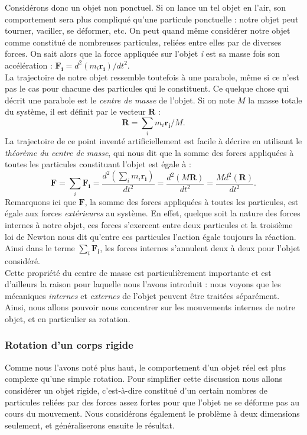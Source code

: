 Considérons donc un objet non ponctuel. Si on lance un tel objet en l'air, son comportement sera plus compliqué qu'une particule ponctuelle : notre objet peut tourner, vaciller, se déformer, etc. On peut quand même considérer notre objet comme constitué de nombreuses particules, reliées entre elles par de diverses forces. On sait alors que la force appliquée sur l'objet \textit{i} est sa masse fois son accélération : $\bm{F_i} = d^2(m_i\bm{r_i})/dt^2$. \\La trajectoire de notre objet ressemble toutefois à une parabole, même si ce n'est pas le cas pour chacune des particules qui le constituent. Ce quelque chose qui décrit une parabole est le \textit{centre de masse} de l'objet. Si on note $M$ la masse totale du système, il est définit par le vecteur $\bm{R}$ :
\begin{equation*}
\bm{R} = \sum_i{m_i\bm{r_i}/M}.
\end{equation*}
La trajectoire de ce point inventé artificiellement est facile à décrire en utilisant le \textit{théorème du centre de masse}, qui nous dit que la somme des forces appliquées à toutes les particules constituant l'objet est égale à :
\begin{equation*}
\bm{F} = \sum_i{\bm{F_i}} = \frac{d^2(\sum_i{m_i\bm{r_i}})}{dt^2} = \frac{d^2(M\bm{R})}{dt^2} = \frac{Md^2(\bm{R})}{dt^2}.
\end{equation*}
Remarquons ici que $\bm{F}$, la somme des forces appliquées à toutes les particules, est égale aux forces \textit{extérieures} au système. En effet, quelque soit la nature des forces internes à notre objet, ces forces s'exercent entre deux particules et la troisième loi de Newton nous dit qu'entre ces particules l'action égale toujours la réaction. Ainsi dans le terme $\sum_i{\bm{F_i}}$, les forces internes s'annulent deux à deux pour l'objet considéré.\\ Cette propriété du centre de masse est particulièrement importante et est d'ailleurs la raison pour laquelle nous l'avons introduit : nous voyons que les mécaniques \textit{internes} et \textit{externes} de l'objet peuvent être traitées séparément. Ainsi, nous allons pouvoir nous concentrer sur les mouvements internes de notre objet, et en particulier sa rotation.

\subsubsection{Rotation d'un corps rigide}
Comme nous l'avons noté plus haut, le comportement d'un objet réel est plus complexe qu'une simple rotation. Pour simplifier cette discussion nous allons considérer un objet rigide, c'est-à-dire constitué d'un certain nombres de particules reliées par des forces assez fortes pour que l'objet ne se déforme pas au cours du mouvement. Nous considérons également le problème à deux dimensions seulement, et généraliserons ensuite le résultat.


